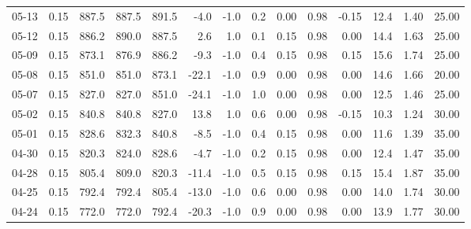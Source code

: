 \begin{threeparttable}
{\begin{tabular}{lrrrrrrrrrrrrr}
  05-13 &     0.15 & 887.5 & 887.5 & 891.5 &       -4.0 &                     -1.0 &                 0.2 &       0.00 &      0.98 &          -0.15 &             12.4 &            1.40 &                  25.00 \\
  05-12 &     0.15 & 886.2 & 890.0 & 887.5 &        2.6 &                      1.0 &                 0.1 &       0.15 &      0.98 &           0.00 &             14.4 &            1.63 &                  25.00 \\
  05-09 &     0.15 & 873.1 & 876.9 & 886.2 &       -9.3 &                     -1.0 &                 0.4 &       0.15 &      0.98 &           0.15 &             15.6 &            1.74 &                  25.00 \\
  05-08 &     0.15 & 851.0 & 851.0 & 873.1 &      -22.1 &                     -1.0 &                 0.9 &       0.00 &      0.98 &           0.00 &             14.6 &            1.66 &                  20.00 \\
  05-07 &     0.15 & 827.0 & 827.0 & 851.0 &      -24.1 &                     -1.0 &                 1.0 &       0.00 &      0.98 &           0.00 &             12.5 &            1.46 &                  25.00 \\
  05-02 &     0.15 & 840.8 & 840.8 & 827.0 &       13.8 &                      1.0 &                 0.6 &       0.00 &      0.98 &          -0.15 &             10.3 &            1.24 &                  30.00 \\
  05-01 &     0.15 & 828.6 & 832.3 & 840.8 &       -8.5 &                     -1.0 &                 0.4 &       0.15 &      0.98 &           0.00 &             11.6 &            1.39 &                  35.00 \\
  04-30 &     0.15 & 820.3 & 824.0 & 828.6 &       -4.7 &                     -1.0 &                 0.2 &       0.15 &      0.98 &           0.00 &             12.4 &            1.47 &                  35.00 \\
  04-28 &     0.15 & 805.4 & 809.0 & 820.3 &      -11.4 &                     -1.0 &                 0.5 &       0.15 &      0.98 &           0.15 &             15.4 &            1.87 &                  35.00 \\
  04-25 &     0.15 & 792.4 & 792.4 & 805.4 &      -13.0 &                     -1.0 &                 0.6 &       0.00 &      0.98 &           0.00 &             14.0 &            1.74 &                  30.00 \\
  04-24 &     0.15 & 772.0 & 772.0 & 792.4 &      -20.3 &                     -1.0 &                 0.9 &       0.00 &      0.98 &           0.00 &             13.9 &            1.77 &                  30.00 \\

\end{tabular}}
\end{threeparttable}
